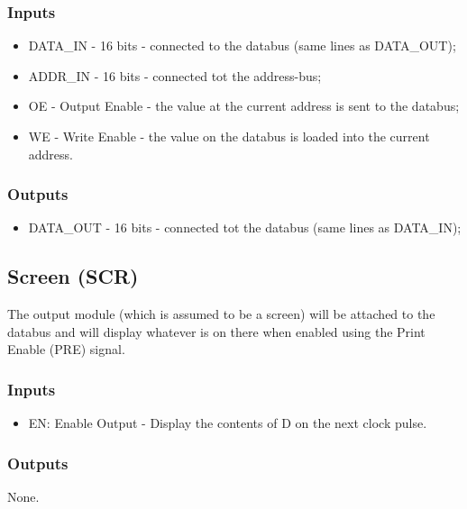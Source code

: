 \subsubsection*{Inputs}
\begin{itemize}
\item DATA\_IN - 16 bits - connected to the databus (same lines as DATA\_OUT);
\item ADDR\_IN - 16 bits - connected tot the address-bus;
\item OE - Output Enable - the value at the current address is sent to the databus;
\item WE - Write Enable - the value on the databus is loaded into the current address.
\end{itemize}

\subsubsection*{Outputs}
\begin{itemize}
\item DATA\_OUT - 16 bits - connected tot the databus (same lines as DATA\_IN);
\end{itemize}

\subsection{Screen (SCR)}  \label{sec:architecture:scr}
The output module (which is assumed to be a screen) will be attached to the databus and will display whatever is on there when enabled using the Print Enable (PRE) signal.
\subsubsection*{Inputs}
\begin{itemize}
\item EN: Enable Output - Display the contents of D on the next clock pulse.
\end{itemize}

\subsubsection*{Outputs}
None.



